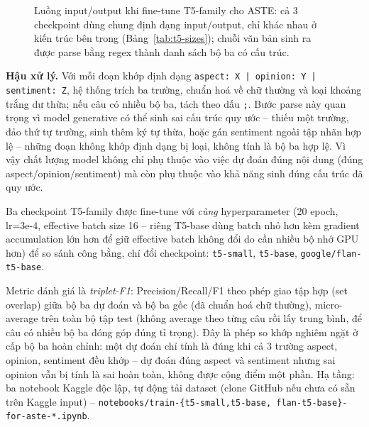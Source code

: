 \documentclass[11pt,a4paper]{article}
\begin{document}
\begin{figure}[h]
\centering
{}
\caption{Luồng input/output khi fine-tune T5-family cho ASTE: cả 3
checkpoint dùng chung định dạng input/output, chỉ khác nhau ở kiến trúc
bên trong (Bảng~\ref{tab:t5-sizes}); chuỗi văn bản sinh ra được parse
bằng regex thành danh sách bộ ba có cấu trúc.}
\end{figure}

\textbf{Hậu xử lý.} Với mỗi đoạn khớp định dạng
\texttt{aspect: X | opinion: Y | sentiment: Z}, hệ thống trích ba trường,
chuẩn hoá về chữ thường và loại khoảng trắng dư thừa; nếu câu có nhiều bộ
ba, tách theo dấu \texttt{;}. Bước parse này quan trọng vì model
generative có thể sinh sai cấu trúc quy ước -- thiếu một trường, đảo thứ
tự trường, sinh thêm ký tự thừa, hoặc gán sentiment ngoài tập nhãn hợp lệ
-- những đoạn không khớp định dạng bị loại, không tính là bộ ba hợp lệ.
Vì vậy chất lượng model không chỉ phụ thuộc vào việc dự đoán đúng nội
dung (đúng aspect/opinion/sentiment) mà còn phụ thuộc vào khả năng sinh
đúng cấu trúc đã quy ước.

Ba checkpoint T5-family được fine-tune với \emph{cùng} hyperparameter (20
epoch, lr=3e-4, effective batch size 16 -- riêng T5-base dùng batch nhỏ hơn
kèm gradient accumulation lớn hơn để giữ effective batch không đổi do cần
nhiều bộ nhớ GPU hơn) để so sánh công bằng, chỉ đổi checkpoint:
\texttt{t5-small}, \texttt{t5-base}, \texttt{google/\allowbreak flan-\allowbreak t5-\allowbreak base}.

Metric đánh giá là \emph{triplet-F1}: Precision/Recall/F1 theo phép giao
tập hợp (set overlap) giữa bộ ba dự đoán và bộ ba gốc (đã chuẩn hoá chữ
thường), micro-average trên toàn bộ tập test (không average theo từng câu
rồi lấy trung bình, để câu có nhiều bộ ba đóng góp đúng tỉ trọng). Đây là
phép so khớp nghiêm ngặt ở cấp bộ ba hoàn chỉnh: một dự đoán chỉ tính là
đúng khi cả 3 trường aspect, opinion, sentiment đều khớp -- dự đoán đúng
aspect và sentiment nhưng sai opinion vẫn bị tính là sai hoàn toàn, không
được cộng điểm một phần. Hạ tầng:
ba notebook Kaggle độc lập, tự động tải dataset (clone GitHub nếu chưa có
sẵn trên Kaggle input) -- \texttt{notebooks/train-\{t5-small,t5-base,%
flan-t5-base\}-for-aste-*.ipynb}.
\end{document}
